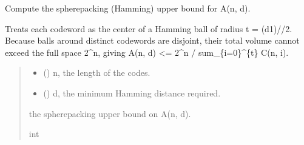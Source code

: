 \documentclass[letterpaper,10pt,english]{sphinxmanual}
\begin{document}

\begin{fulllineitems}
\label{\detokenize{index:hammindist.functions.sphere_packing_bound}}
\pysigstartsignatures
\pysiglinewithargsret
{}
{\sphinxparamcomma {}}
{}
\pysigstopsignatures
\sphinxAtStartPar
Compute the sphere\sphinxhyphen{}packing (Hamming) upper bound for A(n, d).

\sphinxAtStartPar
Treats each codeword as the center of a Hamming ball of radius
t = (d\sphinxhyphen{}1)//2. Because balls around distinct codewords are
disjoint, their total volume cannot exceed the full space 2\textasciicircum{}n,
giving A(n, d) \textless{}= 2\textasciicircum{}n / sum\_\{i=0\}\textasciicircum{}\{t\} C(n, i).
\begin{quote}\begin{description}
\begin{itemize}
\item {} 
\sphinxAtStartPar
{} () \textendash{} n, the length of the codes.

\item {} 
\sphinxAtStartPar
{} () \textendash{} d, the minimum Hamming distance required.

\end{itemize}

\sphinxAtStartPar
the sphere\sphinxhyphen{}packing upper bound on A(n, d).

\sphinxAtStartPar
int

\end{description}\end{quote}

\end{fulllineitems}

\end{document}
